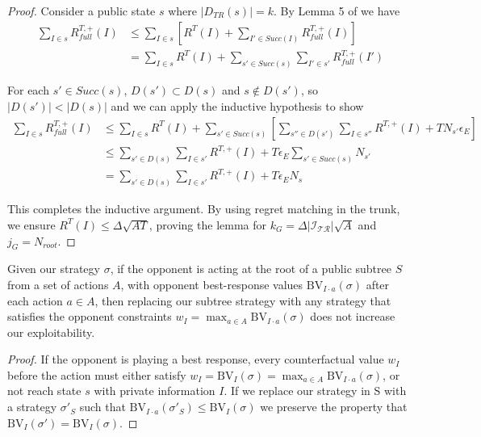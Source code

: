 \begin{proof}
  Consider a public state $s$ where $|D_{TR}(s)| = k$. By Lemma 5 of \cite{ZinkevichEtAl07}
  we have
  \begin{align*}
  \sum_{I \in s} R^{T,+}_{full}(I) &\leq \sum_{I \in s}\left[R^T(I) + \sum_{I' \in Succ(I)}R^{T,+}_{full}(I)\right]\\
  &= \sum_{I \in s} R^T(I) + \sum_{s' \in Succ(s)} \sum_{I' \in s'} R^{T,+}_{full}(I')
  \end{align*}

  For each $s' \in Succ(s)$, $D(s') \subset D(s)$ and $s \not\in D(s')$, so $|D(s')|<|D(s)|$
  and we can apply the inductive hypothesis to show
  \begin{align*}
  \sum_{I \in s} R^{T,+}_{full}(I) &\leq \sum_{I \in s} R^T(I) + \sum_{s' \in Succ(s)} \left[\sum_{s'' \in D(s')}\sum_{I \in s''} R^{T,+}(I) + TN_{s'}\epsilon_E\right]\\
  &\leq \sum_{s' \in D(s)}\sum_{I \in s'} R^{T,+}(I) + T\epsilon_E \sum_{s' \in Succ(s)} N_{s'}\\
  &= \sum_{s' \in D(s)}\sum_{I \in s'} R^{T,+}(I) + T\epsilon_E N_s
  \end{align*}

  This completes the inductive argument. By using regret matching in the trunk, we ensure
  $R^T(I) \leq \Delta\sqrt{AT}$, proving the lemma for $k_G = \Delta|\mathcal{I_{TR}}|\sqrt{A}$
  and $j_G = N_{root}$.
\end{proof}

\begin{lemma}
  Given our strategy $\sigma$, if the opponent is acting at the root
  of a public subtree $S$ from a set of actions $A$, with opponent
  best-response values $\text{BV}_{I \cdot a}(\sigma)$ after each
  action $a \in A$, then replacing our subtree strategy with any
  strategy that satisfies the opponent constraints $w_I = \max_{a \in
    A} \text{BV}_{I \cdot a}(\sigma)$ does not increase our
  exploitability.
  \label{lem:opp_constraint_values}
\end{lemma}
\begin{proof}
  If the opponent is playing a best response, every counterfactual
  value $w_I$ before the action must either satisfy $w_I =
  \text{BV}_I(\sigma) = \max_{a \in A} \text{BV}_{I \cdot a}(\sigma)$,
  or not reach state $s$ with private information $I$. If we replace
  our strategy in S with a strategy $\sigma'_S$ such that
  $\text{BV}_{I \cdot a}(\sigma'_S) \le \text{BV}_I(\sigma)$ we
  preserve the property that $\text{BV}_I(\sigma') =
  \text{BV}_I(\sigma)$.
\end{proof}


